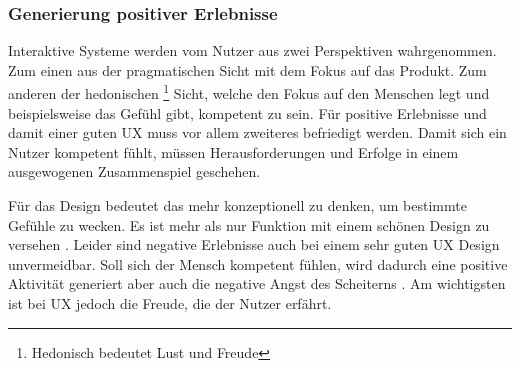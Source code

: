 \subsubsection*{Generierung positiver Erlebnisse}
Interaktive Systeme werden vom Nutzer aus zwei Perspektiven wahrgenommen. Zum einen aus der pragmatischen Sicht mit dem Fokus auf das Produkt. Zum anderen der hedonischen \footnote{Hedonisch bedeutet Lust und Freude} Sicht, welche den Fokus auf den Menschen legt und beispielsweise das Gefühl gibt, kompetent zu sein. Für positive Erlebnisse und damit einer guten UX muss vor allem zweiteres befriedigt werden. Damit sich ein Nutzer kompetent fühlt, müssen Herausforderungen und Erfolge in einem ausgewogenen Zusammenspiel geschehen. \cite{Hassenzahl2008}

Für das Design bedeutet das mehr konzeptionell zu denken, um bestimmte Gefühle zu wecken. Es ist mehr als nur Funktion mit einem schönen Design zu versehen \cite{Hassenzahl2008}. Leider sind negative Erlebnisse auch bei einem sehr guten UX Design unvermeidbar. Soll sich der Mensch kompetent fühlen, wird dadurch eine positive Aktivität generiert aber auch die negative Angst des Scheiterns . Am wichtigsten ist bei UX jedoch die Freude, die der Nutzer erfährt.


